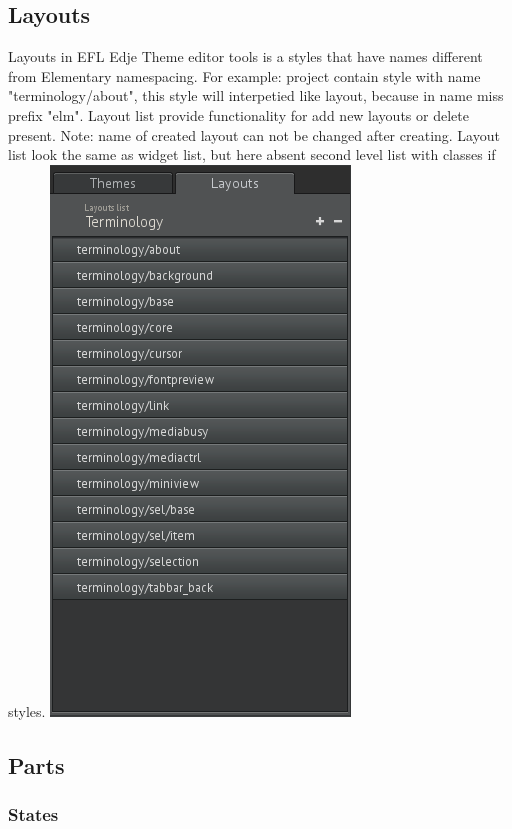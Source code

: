 \documentclass[titlepage,oneside,11pt]{book}
\begin{document}
\subsection{Layouts}
Layouts in EFL Edje Theme editor tools is a styles that have names different from Elementary namespacing. For example: project contain style with name "{}terminology/about"{}, this style will interpetied like layout, because in name miss prefix "{}elm"{}.\newline
Layout list provide functionality for add new layouts or delete present. Note: name of created layout can not be changed after creating.\newline
Layout list look the same as widget list, but here absent second level list with classes if styles.\newline
\includegraphics[scale=0.5]{images/layout_list.png}\newline
\subsection{Parts}
\subsubsection{States}
\end{document}
